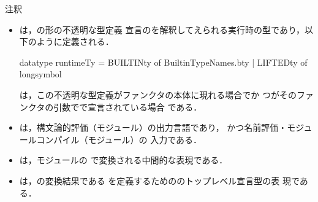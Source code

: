 注釈
\begin{itemize}
\item {}は，の形の不透明な型定義
宣言のを解釈してえられる実行時の型であり，以下のように定義される．
\begin{programPlain}
datatype runtimeTy = BUILTINty of BuiltinTypeNames.bty | LIFTEDty of longsymbol
\end{programPlain}
は，この不透明な型定義がファンクタの本体に現れる場合でか
つがそのファンクタの引数でで宣言されている場合
である．

\item {}は，構文論的評価（モジュール）の出力言語であり，
かつ名前評価・モジュールコンパイル（モジュール）の
入力である．

\item 
	は，モジュールの
で変換される中間的な表現である．
\item {}は，の変換結果である
を定義するためののトップレベル宣言型の表
現である．
\end{itemize}

\else%
\fi%


